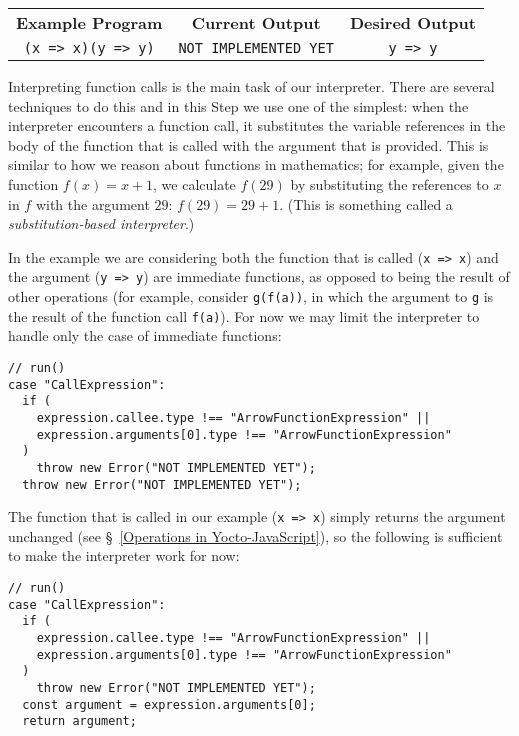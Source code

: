 \documentclass[12pt, oneside]{book}
\begin{document}
\begin{center}
\begin{tabular}{c|c|c}
\textbf{Example Program} & \textbf{Current Output} & \textbf{Desired Output} \\
\texttt{(x => x)(y => y)} & \texttt{NOT IMPLEMENTED YET} & \texttt{y => y} \\
\end{tabular}
\end{center}

\noindent Interpreting function calls is the main task of our interpreter. There are several techniques to do this and in this Step we use one of the simplest: when the interpreter encounters a function call, it substitutes the variable references in the body of the function that is called with the argument that is provided. This is similar to how we reason about functions in mathematics; for example, given the function $f(x) = x + 1$, we calculate $f(29)$ by substituting the references to $x$ in $f$ with the argument $29$: $f(29) = 29 + 1$. (This is something called a \emph{substitution-based interpreter}.)

In the example we are considering both the function that is called (\texttt{x => x}) and the argument (\texttt{y => y}) are immediate functions, as opposed to being the result of other operations (for example, consider \texttt{g(f(a))}, in which the argument to \texttt{g} is the result of the function call \texttt{f(a)}). For now we may limit the interpreter to handle only the case of immediate functions:

\begin{verbatim}
// run()
case "CallExpression":
  if (
    expression.callee.type !== "ArrowFunctionExpression" ||
    expression.arguments[0].type !== "ArrowFunctionExpression"
  )
    throw new Error("NOT IMPLEMENTED YET");
  throw new Error("NOT IMPLEMENTED YET");
\end{verbatim}

The function that is called in our example (\texttt{x => x}) simply returns the argument unchanged (see §~\ref{Operations in Yocto-JavaScript}), so the following is sufficient to make the interpreter work for now:

\begin{verbatim}
// run()
case "CallExpression":
  if (
    expression.callee.type !== "ArrowFunctionExpression" ||
    expression.arguments[0].type !== "ArrowFunctionExpression"
  )
    throw new Error("NOT IMPLEMENTED YET");
  const argument = expression.arguments[0];
  return argument;
\end{verbatim}
\end{document}
